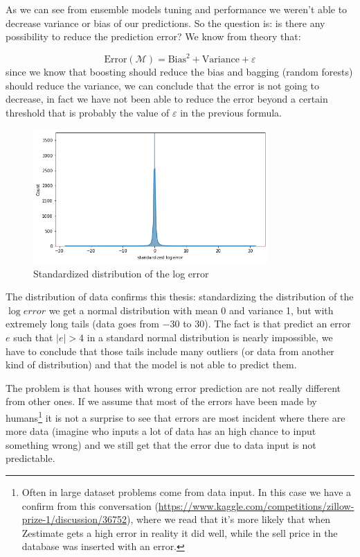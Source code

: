 As we can see from ensemble models tuning and performance we weren't able to decrease variance or bias of our predictions. So the question is: is there any possibility to reduce the prediction error?
We know from theory that:

$$\text{Error}(\mathcal{M} ) = \text{Bias}^2 + \text{Variance} + \varepsilon$$
since we know that boosting should reduce the bias and bagging (random forests) should reduce the variance, we can conclude that the error is not going to decrease, in fact we have not been able to reduce the error beyond a certain threshold that is probably the value of $\varepsilon$ in the previous formula.

  \begin{figure}[h]
    \centering
    \includegraphics[width=0.8\textwidth]{img/standard_log_error_dist.png}
    \caption{Standardized distribution of the log error}
  \end{figure}

The distribution of data confirms this thesis: standardizing the distribution of the $\log error$ we get a normal distribution with mean 0 and variance 1, but with extremely long tails (data goes from $-30$ to $30$). The fact is that predict an error $e$ such that $|e| > 4$ in a standard normal distribution is nearly impossible, we have to conclude that those tails include many outliers (or data from another kind of distribution) and that the model is not able to predict them.

The problem is that houses with wrong error prediction are not really different from other ones. If we assume that most of the errors have been made by humans\footnote{Often in large dataset problems come from data input. In this case we have a confirm from this conversation (\url{https://www.kaggle.com/competitions/zillow-prize-1/discussion/36752}), where we read that it's more likely that when Zestimate gets a high error in reality it did well, while the sell price in the database was inserted with an error.} it is not a surprise to see that errors are most incident where there are more data (imagine who inputs a lot of data has an high chance to input something wrong) and we still get that the error due to data input is not predictable.

